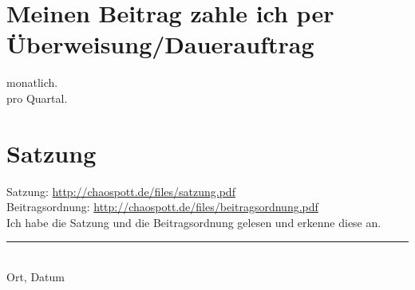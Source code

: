 \begin{Form}
\section*{Meinen Beitrag zahle ich per Überweisung/Dauerauftrag}
\CheckBox[name=8,backgroundcolor=0.9 0.9 0.9,bordercolor=black]{} monatlich.
\\[3mm]
\CheckBox[name=10,backgroundcolor=0.9 0.9 0.9,bordercolor=black]{} pro Quartal.
\\

\section*{Satzung}
Satzung: \url{http://chaospott.de/files/satzung.pdf}\\
Beitragsordnung: \url{http://chaospott.de/files/beitragsordnung.pdf}\\[3mm]
\CheckBox[name=12,backgroundcolor=0.9 0.9 0.9,bordercolor=black]{} Ich habe die Satzung und die Beitragsordnung gelesen und erkenne diese an.\\[1.2cm]


\noindent\rule{6cm}{0.4pt}
\tab{\noindent\rule{6cm}{0.4pt}}\\
Ort, Datum
\end{Form}


